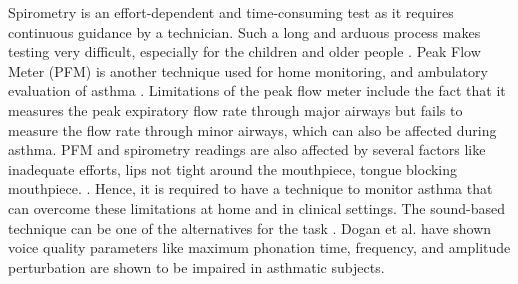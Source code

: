 \documentclass{article}
\begin{document}
Spirometry is an effort-dependent and time-consuming test as it requires continuous guidance by a technician. Such a long and arduous process makes testing very difficult, especially for the children and older people \cite{national1998expert}. Peak Flow Meter (PFM) is another technique used for home monitoring, and ambulatory evaluation of asthma \cite{devrieze2017peak}. Limitations of the peak flow meter include the fact that it measures the peak expiratory flow rate through major airways but fails to measure the flow rate through minor airways, which can also be affected during asthma. PFM and spirometry readings are also affected by several factors like inadequate efforts, lips not tight around the mouthpiece, tongue blocking mouthpiece. \cite{Dowd}. Hence, it is required to have a technique to monitor asthma that can overcome these limitations at home and in clinical settings. The sound-based technique can be one of the alternatives for the task \cite{jane1998spectral}. Dogan et al. \cite{dogan2007subjective} have shown voice quality parameters like maximum phonation time, frequency, and amplitude perturbation are shown to be impaired in asthmatic subjects. 
\end{document}
